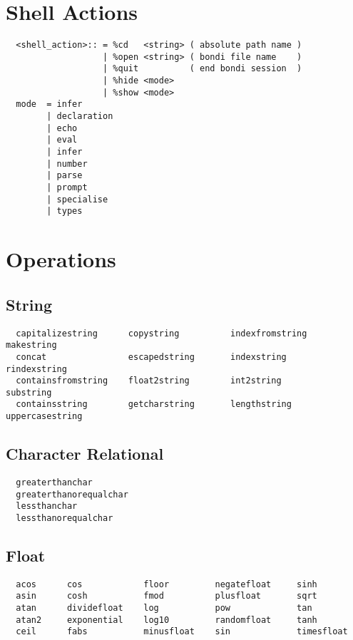 \documentclass{article}
\begin{document}
\section{Shell Actions}
\begin{verbatim}
  <shell_action>:: = %cd   <string> ( absolute path name )   
                   | %open <string> ( bondi file name    )
                   | %quit          ( end bondi session  )
                   | %hide <mode>
                   | %show <mode>
  mode  = infer 
        | declaration 
        | echo 
        | eval 
        | infer 
        | number 
        | parse 
        | prompt
        | specialise
        | types        

\end{verbatim}

\section{Operations}

\subsection{String}
\begin{verbatim}
  capitalizestring      copystring          indexfromstring   makestring
  concat                escapedstring       indexstring       rindexstring
  containsfromstring    float2string        int2string        substring
  containsstring        getcharstring       lengthstring      uppercasestring
\end{verbatim}

\subsection{Character Relational}
\begin{verbatim}
  greaterthanchar
  greaterthanorequalchar
  lessthanchar
  lessthanorequalchar
\end{verbatim}

\subsection{Float}
\begin{verbatim}
  acos      cos            floor         negatefloat     sinh
  asin      cosh           fmod          plusfloat       sqrt
  atan      dividefloat    log           pow             tan
  atan2     exponential    log10         randomfloat     tanh
  ceil      fabs           minusfloat    sin             timesfloat
\end{verbatim}
\end{document}
